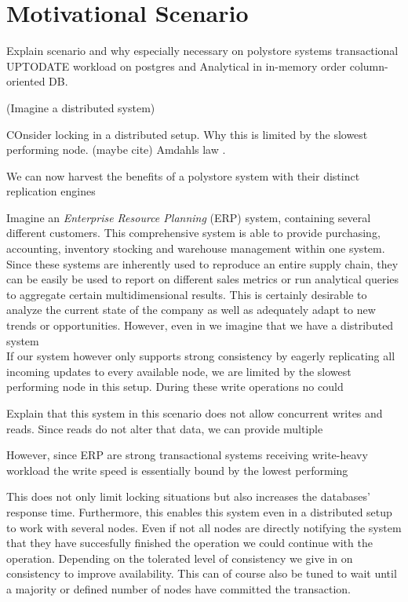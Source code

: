 \chapter{Motivational Scenario}
\label{c:motivation}

Explain scenario and why especially necessary on polystore systems
transactional UPTODATE workload on postgres and 
Analytical in in-memory order column-oriented DB. 

(Imagine a distributed system)

COnsider locking in a distributed setup. Why this is limited by the slowest performing node.
(maybe cite) Amdahls law .

We can now harvest the benefits of a polystore system with their distinct replication engines

Imagine an \emph{Enterprise Resource Planning} (ERP) system, containing several different customers.
This comprehensive system is able to provide purchasing, accounting, inventory stocking and warehouse management within one system.
Since these systems are inherently used to reproduce an entire supply chain, they can be easily be used to report on different sales metrics
or run analytical queries to aggregate certain multidimensional results. This is certainly desirable to analyze the current state of the company as well as adequately adapt 
to new trends or opportunities. However, even in we imagine that we have a distributed system \\
If our system however only supports strong consistency by eagerly replicating all incoming updates to every available node, 
we are limited by the slowest performing node in this setup. During these write operations no could

Explain that this system in this scenario does not allow concurrent writes and reads. Since reads do not alter that data, we can provide multiple 




However, since ERP  are strong transactional systems receiving write-heavy workload the write speed is essentially bound by the lowest performing

This does not only limit locking situations but also increases the databases' response time. Furthermore, this enables this system even in a distributed setup to work 
with several nodes. Even if not all nodes are directly notifying the system that they have succesfully finished the operation we could continue with the operation.
Depending on the tolerated level of consistency we give in on consistency to improve availability. This can of course also be tuned to wait until a majority or defined number of nodes 
have committed the transaction.

